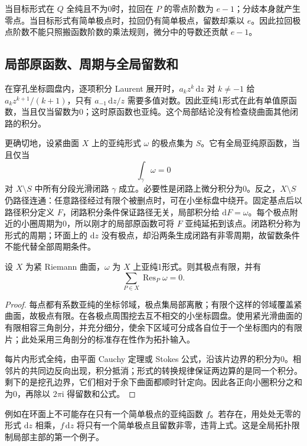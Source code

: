 当目标形式在 \(Q\) 全纯且不为0时，拉回在 \(P\) 的零点阶数为 \(e-1\)；分歧本身就产生零点。当目标形式有简单极点时，拉回仍有简单极点，留数却乘以 \(e\)。因此拉回极点阶数不能只照搬函数阶数的乘法规则，微分中的导数还贡献 \(e-1\)。

\subsection{局部原函数、周期与全局留数和}
\label{b3:subsec:A0202}

在穿孔坐标圆盘内，逐项积分 Laurent 展开时，\(a_k z^k\,\mathrm{d}z\) 对 \(k\ne-1\) 给 \(a_k z^{k+1}/(k+1)\)，只有 \(a_{-1}\,\mathrm{d}z/z\) 需要多值对数。因此亚纯1形式在此有单值原函数，当且仅当留数为0；这时原函数也亚纯。这个局部结论没有检查绕曲面其他闭路的积分。

\ProseParagraphBreak
更确切地，设紧曲面 \(X\) 上的亚纯形式 \(\omega\) 的极点集为 \(S\)。它有全局亚纯原函数，当且仅当
\[
 \int_\gamma\omega=0
\]
对 \(X\setminus S\) 中所有分段光滑闭路 \(\gamma\) 成立。必要性是闭路上微分积分为0。反之，\(X\setminus S\) 仍路径连通：任意路径经过有限个被删点时，可在小坐标盘中绕开。固定基点后以路径积分定义 \(F\)，闭路积分条件保证路径无关，局部积分给 \(\mathrm{d}F=\omega\)。每个极点附近的小圈周期为0，所以刚才的局部原函数可将 \(F\) 亚纯延拓到该点。闭路积分称为形式的周期；环面上的 \(\mathrm{d}z\) 没有极点，却沿两条生成闭路有非零周期，故留数条件不能代替全部周期条件。

\begin{theorem}[紧曲面的留数和]\label{b3:thm:A-global-residue}
设 \(X\) 为紧 Riemann 曲面，\(\omega\) 为 \(X\) 上亚纯1形式。则其极点有限，并有
\[
 \sum_{P\in X}\operatorname{Res}_P\omega=0.
\]
\end{theorem}
\begin{proof}
每点都有系数亚纯的坐标邻域，极点集局部离散；有限个这样的邻域覆盖紧曲面，故极点有限。在各极点周围挖去互不相交的小坐标圆盘。使用紧光滑曲面的有限相容三角剖分，并充分细分，使余下区域可分成各自位于一个坐标图内的有限片；此处采用三角剖分的标准存在性作为拓扑输入。

每片内形式全纯，由平面 Cauchy 定理或 Stokes 公式，沿该片边界的积分为0。相邻片的共同边反向出现，积分抵消；形式的转换规律保证两边算的是同一个积分。剩下的是挖孔边界，它们相对于余下曲面都顺时针定向。因此各正向小圈积分之和为0，再除以 \(2\pi\mathrm{i}\) 得留数和公式。
\end{proof}

例如在环面上不可能存在只有一个简单极点的亚纯函数 \(f\)。若存在，用处处无零的形式 \(\mathrm{d}z\) 相乘，\(f\,\mathrm{d}z\) 将只有一个简单极点且留数非零，违背上式。这是全局拓扑限制局部主部的第一个例子。

